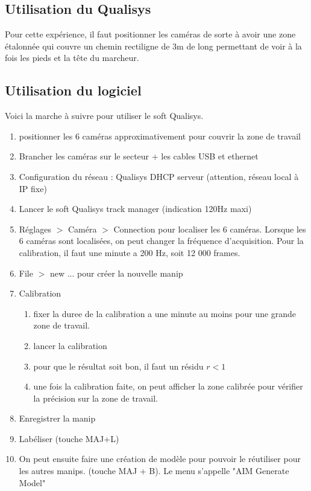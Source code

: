 \documentclass[a4paper, 10pt ]{article}
\begin{document}
\subsection{Utilisation du Qualisys}

Pour cette expérience, il faut positionner les caméras de sorte à avoir une zone étalonnée qui couvre un chemin rectiligne de 3m de long permettant de voir à la fois les pieds et la tête du marcheur. \\

\subsection{Utilisation du logiciel}
Voici la marche à suivre pour utiliser le soft Qualisys.

\begin{enumerate}
\item positionner les 6 caméras approximativement pour couvrir la zone de travail
\item Brancher les caméras sur le secteur + les cables USB et ethernet
\item Configuration du réseau : Qualisys DHCP serveur (attention, réseau local à IP fixe)
\item Lancer le soft Qualisys track manager (indication 120Hz maxi)
\item Réglages $>$ Caméra $>$ Connection pour localiser les 6 caméras. Lorsque les 6 caméras sont localisées, on peut changer la fréquence d'acquisition. Pour la calibration, il faut une minute a 200 Hz, soit 12 000 frames.
\item File $>$ new ... pour créer la nouvelle manip
\item Calibration
\begin{enumerate}
\item fixer la duree de la calibration a une minute au moins pour une grande zone de travail.
\item lancer la calibration
\item pour que le résultat soit bon, il faut un résidu $r<1$
\item une fois la calibration faite, on peut afficher la zone calibrée pour vérifier la précision sur la zone de travail.
\end{enumerate}
\item Enregistrer la manip
\item Labéliser (touche MAJ+L)
\item On peut ensuite faire une création de modèle pour pouvoir le réutiliser pour les autres manips. (touche MAJ + B). Le menu s'appelle "AIM Generate Model"
\end{enumerate}
\end{document}
